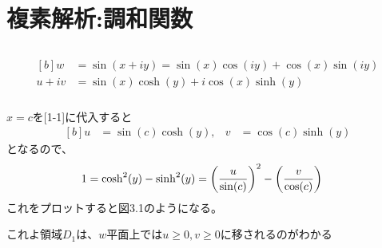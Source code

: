 \documentclass[../ap_2016.tex]{subfiles}
\begin{document}
\setcounter{chapter}{2}
\chapter{複素解析:調和関数}
\section{}
\subsection{}
\begin{equation}\begin{aligned}[b]
    w &= \sin(x+iy) = \sin(x)\cos(iy)+\cos(x)\sin(iy)\\
    u +iv &= \sin(x)\cosh(y)+i\cos(x)\sinh(y)
\end{aligned}\end{equation}

\subsection{}
\(x=c\)を[1-1]に代入すると
\begin{equation}\begin{aligned}[b]
    u &= \sin(c)\cosh(y), & v &= \cos(c)\sinh(y)
\end{aligned}\end{equation}
となるので、
\begin{equation}\begin{aligned}[b]
    1 &= \cosh^2(y)-\sinh^2(y)=\qty(\frac{u}{\sin(c)})^2-\qty(\frac{v}{\cos(c)})
\end{aligned}\end{equation}
これをプロットすると図3.1のようになる。

これよ領域\(D_1\)は、\(w\)平面上では\(u\geq0,v\geq0\)に移されるのがわかる
\end{document}
